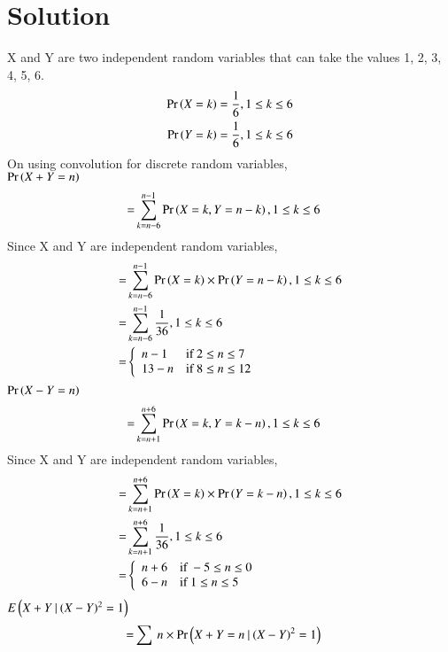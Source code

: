 \documentclass[journal,12pt,twocolumn]{IEEEtran}
\begin{document}
\section*{Solution}
X and Y are two independent random variables that can take the values 1, 2, 3, 4, 5, 6.
\begin{align}
    \Pr\left(X=k\right)=\frac{1}{6}, 1\leq k \leq 6\\
    \Pr\left(Y=k\right)=\frac{1}{6}, 1\leq k \leq 6
\end{align}
On using convolution for discrete random variables,\\
$\Pr\left(X+Y=n\right)$
\begin{align}
    =&\sum_{k=n-6}^{n-1} \Pr\left(X=k,Y=n-k\right), 1\leq k \leq 6
\end{align}
Since X and Y are independent random variables,
\begin{align}
    =&\sum_{k=n-6}^{n-1} \Pr\left(X=k\right)\times\Pr\left(Y=n-k\right), 1\leq k \leq 6\\
    =&\sum_{k=n-6}^{n-1} \frac{1}{36}, 1\leq k \leq 6\label{0.0.12}\\
    =&
    \left\{
	        \begin{array}{ll}
		    n-1  & \mbox{if } 2 \leq n \leq 7 \\
		    13-n & \mbox{if } 8 \leq n \leq 12
	        \end{array}
    \right.
\end{align}
$\Pr\left(X-Y=n\right)$
\begin{align}
    =&\sum_{k=n+1}^{n+6} \Pr\left(X=k,Y=k-n\right), 1\leq k \leq 6
\end{align}
Since X and Y are independent random variables,
\begin{align}
    =&\sum_{k=n+1}^{n+6} \Pr\left(X=k\right)\times\Pr\left(Y=k-n\right), 1\leq k \leq 6\\
    =&\sum_{k=n+1}^{n+6} \frac{1}{36}, 1\leq k \leq 6\label{0.0.16}\\
    =&
    \left\{
	        \begin{array}{ll}
		    n+6 & \mbox{if } -5 \leq n \leq 0 \\
		    6-n & \mbox{if } 1  \leq n \leq 5
	        \end{array}
    \right.
\end{align}
$E\left(X+Y\:|\:(X-Y)^2=1\right)$
\begin{align}
    =&\sum\:n\times\Pr\left(X+Y=n\:|\:(X-Y)^2=1\right)
\end{align}
\end{document}

